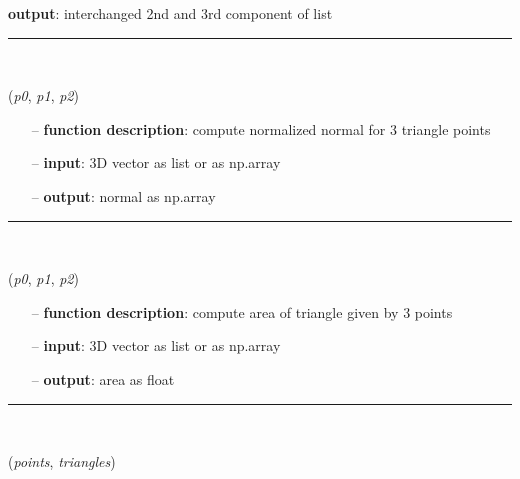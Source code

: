 \begin{itemize}[leftmargin=1.4cm]
\begin{itemize}[leftmargin=1.4cm]
\begin{itemize}[leftmargin=1.4cm]
\begin{itemize}[leftmargin=0.5cm]
\begin{itemize}[leftmargin=1.4cm]
\begin{itemize}[leftmargin=1.4cm]
\begin{itemize}[leftmargin=0.5cm]
\begin{itemize}[leftmargin=1.4cm]
\begin{itemize}[leftmargin=1.4cm]
\begin{itemize}[leftmargin=0.5cm]
\begin{itemize}[leftmargin=0.7cm]
{\bf output}: interchanged 2nd and 3rd component of list
\vspace{12pt}\end{itemize}
%
\noindent\rule{8cm}{0.75pt}\vspace{1pt} \\ 
\begin{flushleft}
\label{sec:graphicsDataUtilities:ComputeTriangleNormal}
({\it p0}, {\it p1}, {\it p2})
\end{flushleft}
\setlength{\itemindent}{0.7cm}
\begin{itemize}[leftmargin=0.7cm]
\item[--]
{\bf function description}: compute normalized normal for 3 triangle points
\item[--]
{\bf input}: 3D vector as list or as np.array
\item[--]
{\bf output}: normal as np.array
\vspace{12pt}\end{itemize}
%
\noindent\rule{8cm}{0.75pt}\vspace{1pt} \\ 
\begin{flushleft}
\label{sec:graphicsDataUtilities:ComputeTriangleArea}
({\it p0}, {\it p1}, {\it p2})
\end{flushleft}
\setlength{\itemindent}{0.7cm}
\begin{itemize}[leftmargin=0.7cm]
\item[--]
{\bf function description}: compute area of triangle given by 3 points
\item[--]
{\bf input}: 3D vector as list or as np.array
\item[--]
{\bf output}: area as float
\vspace{12pt}\end{itemize}
%
\noindent\rule{8cm}{0.75pt}\vspace{1pt} \\ 
\begin{flushleft}
\label{sec:graphicsDataUtilities:RefineMesh}
({\it points}, {\it triangles})
\end{flushleft}

\end{itemize}
\end{itemize}
\end{itemize}
\end{itemize}
\end{itemize}
\end{itemize}
\end{itemize}
\end{itemize}
\end{itemize}
\end{itemize}
